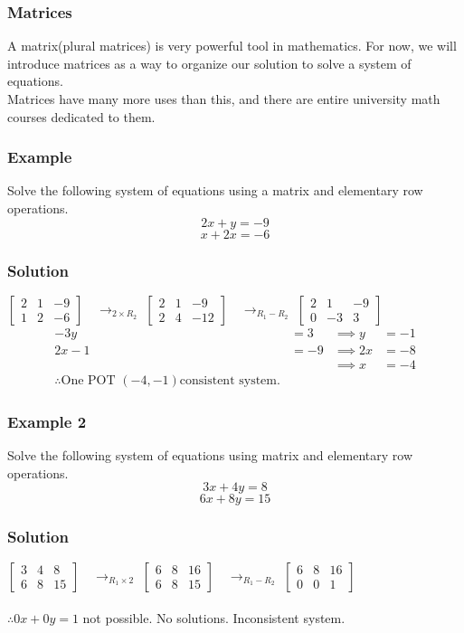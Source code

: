 \documentclass{article}
\begin{document}
\subsubsection{Matrices}
A matrix(plural matrices) is very powerful tool in mathematics. For now, we will introduce matrices as a way to organize our solution to solve a system of equations.\\
Matrices have many more uses than this, and there are entire university math courses dedicated to them.
\subsubsection*{Example}
Solve the following system of equations using a matrix and elementary row operations.
$$2x+y=-9$$
$$x+2x=-6$$
\subsubsection*{Solution}
$ \left[\begin{array}{ll|l}
2 & 1 & -9 \\
1 & 2 & -6
\end{array}\right] \quad \rightarrow_{2\times R_2}$
$ \left[\begin{array}{ll|l}
2 & 1 & -9 \\
2 & 4 & -12
\end{array}\right] \quad \rightarrow_{R_1-R_2}$
$ \left[\begin{array}{ll|l}
2 & 1 & -9 \\
0 & -3 & 3
\end{array}\right]$
$$
\begin{aligned}
-3y &= 3 & \implies y &= -1 \\
2x - 1 &= -9 & \implies 2x &= -8 \\
& & \implies x &= -4\\
\therefore \text{One POT } (-4,-1) \text{consistent system.}
\end{aligned}
$$
\subsubsection*{Example 2}
Solve the following system of equations using matrix and elementary row operations.
$$3x+4y=8$$
$$6x+8y=15$$
\subsubsection*{Solution}
$ \left[\begin{array}{ll|l}
3 & 4 & 8 \\
6 & 8 & 15
\end{array}\right] \quad \rightarrow_{R_1\times 2}$
$ \left[\begin{array}{ll|l}
6 & 8 & 16 \\
6 & 8 & 15
\end{array}\right] \quad \rightarrow_{R_1-R_2}$
$ \left[\begin{array}{ll|l}
6 & 8 & 16 \\
0 & 0 & 1
\end{array}\right] $\\\\
$\therefore 0x+0y=1$ not possible. No solutions. Inconsistent system. 
\end{document}
